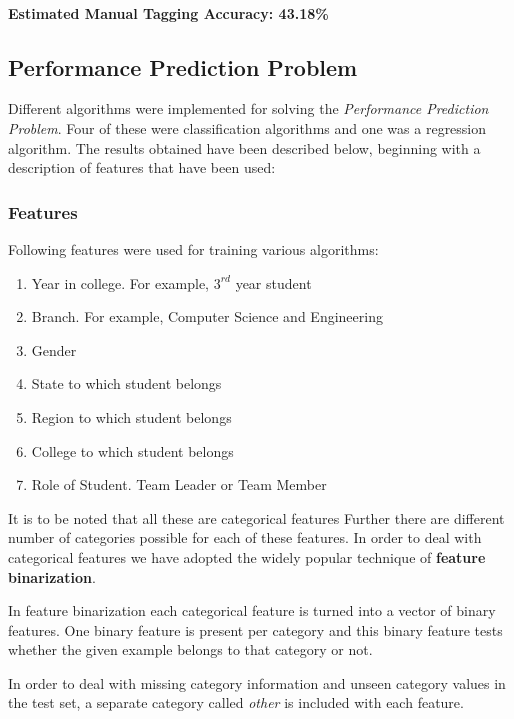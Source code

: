 \documentclass[12pt]{article}
\begin{document}
	\paragraph{Estimated Manual Tagging Accuracy: 43.18\%}
	
	\subsection{Performance Prediction Problem}
	Different algorithms were implemented for solving the
	\textit{Performance Prediction Problem}. Four of these were classification
	algorithms and one was a regression algorithm. The results obtained have
	been described below, beginning with a description of features that have
	been used:
	
	\subsubsection{Features}
	\label{features}
	Following features were used for training various algorithms:
	
	\begin{enumerate}
		\item Year in college. For example, $3^{rd}$ year student
		\item Branch. For example, Computer Science and Engineering
		\item Gender
		\item State to which student belongs
		\item Region to which student belongs
		\item College to which student belongs
		\item Role of Student. Team Leader or Team Member
	\end{enumerate}
	
	It is to be noted that all these are categorical features Further
	there are different number of categories possible for each of these
	features. In order to deal with categorical features we have adopted
	the widely popular technique of \textbf{feature binarization}.\newline
	
	In feature binarization each categorical feature is turned into a vector
	of binary features. One binary feature is present per category and this
	binary feature tests whether the given example belongs to that category or
	not.\newline
	
	In order to deal with missing category information and unseen category
	values in the test set, a separate category called \textit{other} is
	included with each feature.
\end{document}
